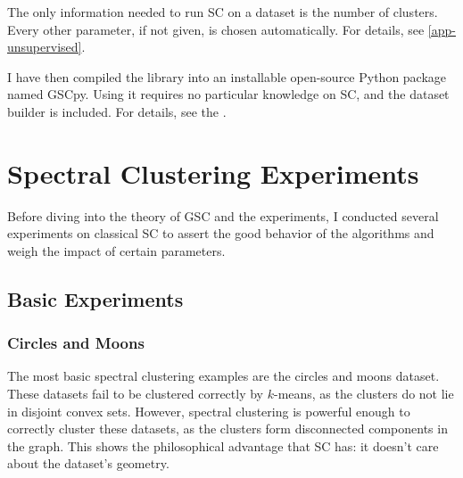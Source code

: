 \documentclass[a4paper,12pt]{article}
\theoremstyle{definition}
\theoremstyle{plain}
\begin{document}
The only information needed to run SC on a dataset is the number of clusters. Every other parameter, if not given, is chosen automatically. For details, see \ref{app-unsupervised}.

I have then compiled the library into an installable open-source Python package named GSCpy. Using it requires no particular knowledge on SC, and the dataset builder is included. For details, see the \cite[Github repository of the project]{github}.

\section{Spectral Clustering Experiments} \label{sec-exp}

Before diving into the theory of GSC and the experiments, I conducted several experiments on classical SC to assert the good behavior of the algorithms and weigh the impact of certain parameters.

\subsection{Basic Experiments}

\subsubsection{Circles and Moons}

The most basic spectral clustering examples are the circles and moons dataset. These datasets fail to be clustered correctly by $k$-means, as the clusters do not lie in disjoint convex sets. However, spectral clustering is powerful enough to correctly cluster these datasets, as the clusters form disconnected components in the graph. This shows the philosophical advantage that SC has: it doesn't care about the dataset's geometry.
\end{document}
